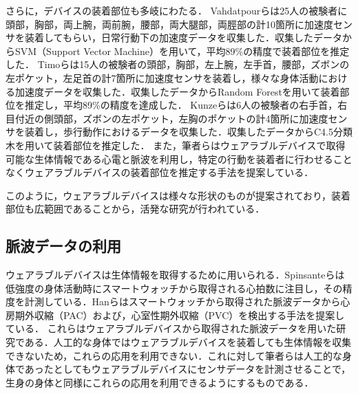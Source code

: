 \documentclass[Japanese,noauthor]{dicomopapers}
\begin{document}
さらに，デバイスの装着部位も多岐にわたる．
Vahdatpourら\cite{localization_vahdatpour}は25人の被験者に頭部，胸部，両上腕，両前腕，腰部，両大腿部，両脛部の計10箇所に加速度センサを装着してもらい，日常行動下の加速度データを収集した．収集したデータからSVM（Support Vector Machine）を用いて，平均89\%の精度で装着部位を推定した．
Timoら\cite{localization_timo}は15人の被験者の頭部，胸部，左上腕，左手首，腰部，ズボンの左ポケット，左足首の計7箇所に加速度センサを装着し，様々な身体活動における加速度データを収集した．収集したデータからRandom Forestを用いて装着部位を推定し，平均89\%の精度を達成した．
Kunzeら\cite{localization_kunze}は6人の被験者の右手首，右目付近の側頭部，ズボンの左ポケット，左胸のポケットの計4箇所に加速度センサを装着し，歩行動作におけるデータを収集した．収集したデータからC4.5分類木を用いて装着部位を推定した．
また，筆者ら\cite{localization_yoshida}はウェアラブルデバイスで取得可能な生体情報である心電と脈波を利用し，特定の行動を装着者に行わせることなくウェアラブルデバイスの装着部位を推定する手法を提案している．
\par

このように，ウェアラブルデバイスは様々な形状のものが提案されており，装着部位も広範囲であることから，活発な研究が行われている．


\subsection{脈波データの利用}
ウェアラブルデバイスは生体情報を取得するために用いられる．Spinsanteら\cite{accuracy_in_low_intensity}は低強度の身体活動時にスマートウォッチから取得される心拍数に注目し，その精度を計測している．Hanら\cite{arrhythmia_detection}はスマートウォッチから取得された脈波データから心房期外収縮（PAC）および，心室性期外収縮（PVC）を検出する手法を提案している．
これらはウェアラブルデバイスから取得された脈波データを用いた研究である．人工的な身体ではウェアラブルデバイスを装着しても生体情報を収集できないため，これらの応用を利用できない．これに対して筆者らは人工的な身体であったとしてもウェアラブルデバイスにセンサデータを計測させることで，生身の身体と同様にこれらの応用を利用できるようにするものである．
\end{document}
